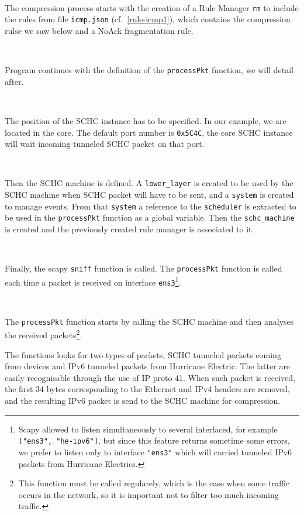~~

The compression process starts with the creation of a Rule Manager \texttt{rm} to include the rules from file \texttt{icmp.json} (cf.~\vref{rule-icmp1}), which contains  the compression rulse we saw below and a NoAck fragmentation rule.

~~

Program continues with the definition of the \texttt{processPkt} function, we will detail after.

~~

The position of the SCHC instance has to be specified. In our example, we are located in the core. The default port number is \texttt{0x5C4C}, the core SCHC instance will wait incoming tunneled SCHC packet on that port.

~~~

Then the SCHC machine is defined. A \texttt{lower\_layer} is created to be used by the SCHC machine when SCHC packet will have to be sent, and a \texttt{system} is created to manage events. From that \texttt{system} a reference to the \texttt{scheduler} is extracted to be used in the \texttt{processPkt} function as a global variable. Then the \texttt{schc\_machine} is created and the previously created rule manager is associated to it.

~~~

Finally, the scapy \texttt{sniff} function is called. The \texttt{processPkt} function is called each time a packet is received on interface \texttt{ens3}\footnote{Scapy allowed to listen simultaneously to several interfaced, for example \texttt{["ens3", "he-ipv6"]}, but since this feature returns sometime some errors, we prefer to listen only to interface \texttt{"ens3"} which will carried tunneled IPv6 packets from Hurricane Electrics.}.

~~~

The \texttt{processPkt} function starts by calling the SCHC machine and then analyses the received packets\footnote{This function must be called regularely, which is the case when some traffic occurs in the network, so it is important not to filter too much incoming traffic.}. 

The functions looks for two types of packets, SCHC tunneled packets coming from devices and IPv6 tunneled packets from Hurricane Electric. The latter are easily recognisable through the use of IP proto 41. When such packet is received, the first 34 bytes corresponding to the Ethernet and IPv4 headers are removed, and the resulting IPv6 packet is send to the SCHC machine for compression.

